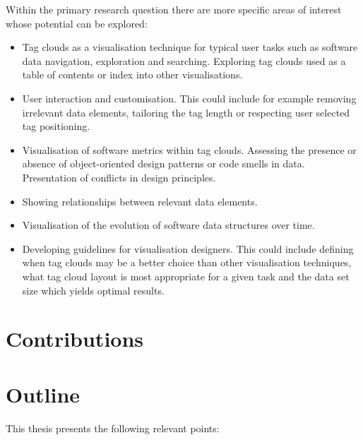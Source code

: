 Within the primary research question there are more specific areas of interest whose potential can be explored:

\begin{itemize}
	\item Tag clouds as a visualisation technique for typical user tasks such as software data navigation, exploration and searching. Exploring tag clouds used as a table of contents or index into other visualisations.
	\item User interaction and customisation. This could include for example removing irrelevant data elements, tailoring the tag length or respecting user selected tag positioning.
	\item Visualisation of software metrics within tag clouds. Assessing the presence or absence of object-oriented design patterns or code smells in data. Presentation of conflicts in design principles.
	\item Showing relationships between relevant data elements.
	\item Visualisation of the evolution of software data structures over time.
	\item Developing guidelines for visualisation designers. This could include defining when tag clouds may be a better choice than other visualisation techniques, what tag cloud layout is most appropriate for a given task and the data set size which yields optimal results.
\end{itemize}

\section{Contributions}

\section{Outline}
This thesis presents the following relevant points:

